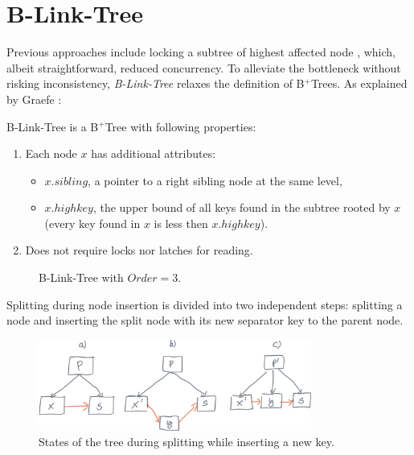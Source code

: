 \section{B-Link-Tree}\label{section:b-link-tree}

Previous approaches include locking a subtree of highest affected node \cite{samadi1976b}, which, albeit straightforward, reduced concurrency. To alleviate the bottleneck without risking inconsistency, \textit{B-Link-Tree} relaxes the definition of B$^+$Trees. As explained by Graefe \cite{goetz-tech}:

\begin{definition}
  B-Link-Tree is a B$^+$Tree with following properties:
  \begin{enumerate}
    \item Each node $x$ has additional attributes:
          \begin{itemize}
            \item $x.\mathit{sibling}$, a pointer to a right sibling node at the same level,
            \item $x.highkey$, the upper bound of all keys found in the subtree rooted by $x$ (every key found in $x$ is less then $x.highkey$).
          \end{itemize}
    \item Does not require locks nor latches for reading.
  \end{enumerate}
\end{definition}

\begin{figure}
  \centering
  
  \caption{B-Link-Tree with $\mathit{Order} = 3$.}
\end{figure}

Splitting during node insertion is divided into two independent steps: splitting a node and inserting the split node with its new separator key to the parent node.

\begin{figure}[H]
  \centering
  \includegraphics[width=0.8\textwidth ]{components/figure/b-link-insert}
  \caption{States of the tree during splitting while inserting a new key.}
  \label{figure:b-link-insert}
\end{figure}

